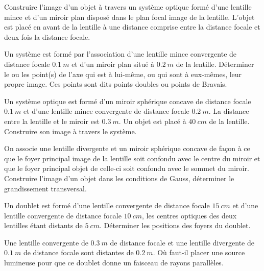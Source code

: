 %
\begin{exercice}
Construire l'image d'un objet à travers un système optique formé d'une lentille mince et d'un miroir plan disposé dans le plan focal image de la lentille. L'objet est placé en avant de la lentille à une distance comprise entre la distance focale et deux fois la distance focale.
\end{exercice}
%
\begin{exercice}
Un système est formé par l'association d'une lentille mince convergente de distance focale $\SI{0,1}{m}$ et d'un miroir plan situé à $\SI{0,2}{m}$ de la lentille. Déterminer le ou les point(s) de l'axe qui est à lui-même, ou qui sont à eux-mêmes, leur propre image. Ces points sont dits points doubles ou points de Bravais.
\end{exercice}
%
\begin{exercice}
Un système optique est formé d'un miroir sphérique concave de distance focale $\SI{0,1}{m}$ et d'une lentille mince convergente de distance focale $\SI{0,2}{m}$. La distance entre la lentille et le miroir est $\SI{0,3}{m}$. Un objet est placé à $\SI{40}{cm}$ de la lentille. Construire son image à travers le système.
\end{exercice}
%
\begin{exercice}
On associe une lentille divergente et un miroir sphérique concave de façon à ce que le foyer principal image de la lentille soit confondu avec le centre du miroir et que le foyer principal objet de celle-ci soit confondu avec le sommet du miroir. Construire l'image d'un objet dans les conditions de Gauss, déterminer le grandissement transversal.
\end{exercice}
%
\begin{exercice}
Un doublet est formé d'une lentille convergente de distance focale $\SI{15}{cm}$ et d'une lentille convergente de distance focale $\SI{10}{cm}$, les centres optiques des deux lentilles étant distants de $\SI{5}{cm}$. Déterminer les positions des foyers du doublet.
\end{exercice}
%
\begin{exercice}
Une lentille convergente de $\SI{0,3}{m}$ de distance focale et une lentille divergente de $\SI{0,1}{m}$ de distance focale sont distantes de $\SI{0,2}{m}$. Où faut-il placer une source lumineuse pour que ce doublet donne un faisceau de rayons parallèles.
\end{exercice}
